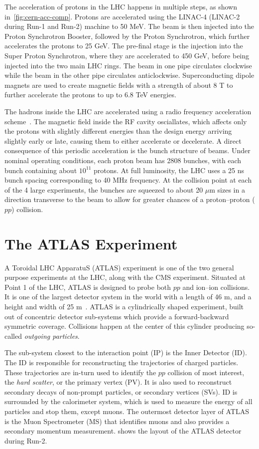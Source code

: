The acceleration of protons in the LHC happens in multiple steps, as shown in~\cref{fig:cern-acc-comp}. Protons are accelerated using the LINAC-4 (LINAC-2 during Run-1 and Run-2) machine to 50 MeV. The beam is then injected into the Proton Synchrotron Booster, followed by the Proton Synchrotron, which further accelerates the protons to 25 GeV. The pre-final stage is the injection into the Super Proton Synchrotron, where they are accelerated to 450 GeV, before being injected into the two main LHC rings. The beam in one pipe circulates clockwise while the beam in the other pipe circulates anticlockwise. Superconducting dipole magnets are used to create magnetic fields with a strength of about 8 T to further accelerate the protons to up to 6.8 TeV energies. 

The hadrons inside the LHC are accelerated using a radio frequency acceleration scheme~\cite{LHC}. The magnetic field inside the RF cavity osciallates, which affects only the protons with slightly different energies than the design energy arriving slightly early or late, causing them to either accelerate or decelerate. A direct consequence of this periodic acceleration is the bunch structure of beams. Under nominal operating conditions, each proton beam has 2808 bunches, with each bunch containing about $10^{11}$ protons. At full luminosity, the LHC uses a 25 ns bunch spacing corresponding to 40 MHz frequency. At the collision point at each of the 4 large experiments, the bunches are squeezed to about 20 $\mu$m sizes in a direction transverse to the beam to allow for greater chances of a proton--proton ($pp$) collision.

\section{The ATLAS Experiment} \label{sec:atlas}

A Toroidal LHC ApparatuS (ATLAS) experiment is one of the two general purpose experiments at the LHC, along with the CMS experiment. Situated at Point 1 of the LHC, ATLAS is designed to probe both $pp$ and ion--ion collisions. It is one of the largest detector system in the world with a length of 46 m, and a height and width of 25 m~\cite{ATLAS}. ATLAS is a cylindrically shaped experiment, built out of concentric detector sub-systems which provide a forward-backward symmetric coverage. Collisions happen at the center of this cylinder producing so-called \textit{outgoing particles}.

The sub-system closest to the interaction point (IP) is the Inner Detector (ID). The ID is responsible for reconstructing the trajectories of charged particles. These trajectories are in-turn used to identify the $pp$ collision of most interest, the \textit{hard scatter}, or the primary vertex (PV). It is also used to reconstruct secondary decays of non-prompt particles, or secondary vertices (SVs). ID is surrounded by the calorimeter system, which is used to measure the energy of all particles and stop them, except muons. The outermost detector layer of ATLAS is the Muon Spectrometer (MS) that identifies muons and also provides a secondary momentum measurement.  shows the layout of the ATLAS detector during Run-2.

